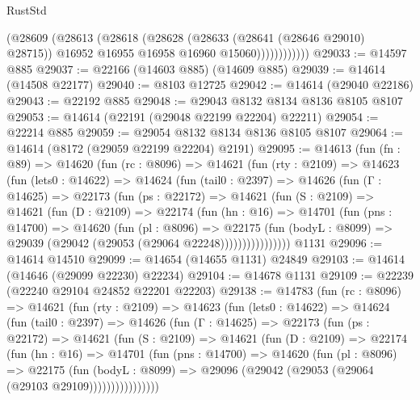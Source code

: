\begin{lexlean}{RustStd}
\begin{coremodule}
                    (@28609
                      (@28613
                        (@28618
                          (@28628
                            (@28633 (@28641 (@28646 @29010) @28715))
                            @16952
                            @16955
                            @16958
                            @16960
                            @15060))))))))))))
@29033 := @14597 @885
@29037 := @22166 (@14603 @885) (@14609 @885)
@29039 := @14614 (@14508 @22177)
@29040 := @8103 @12725
@29042 := @14614 (@29040 @22186)
@29043 := @22192 @885
@29048 := @29043 @8132 @8134 @8136 @8105 @8107
@29053 := @14614 (@22191 (@29048 @22199 @22204) @22211)
@29054 := @22214 @885
@29059 := @29054 @8132 @8134 @8136 @8105 @8107
@29064 := @14614 (@8172 (@29059 @22199 @22204) @2191)
@29095 := @14613
    (fun (fn : @89) =>
    @14620
      (fun (rc : @8096) =>
      @14621
        (fun (rty : @2109) =>
        @14623
          (fun (lets0 : @14622) =>
          @14624
            (fun (tail0 : @2397) =>
            @14626
              (fun (Γ : @14625) =>
              @22173
                (fun (ps : @22172) =>
                @14621
                  (fun (S : @2109) =>
                  @14621
                    (fun (D : @2109) =>
                    @22174
                      (fun (hn : @16) =>
                      @14701
                        (fun (pns : @14700) =>
                        @14620
                          (fun (pl : @8096) =>
                          @22175
                            (fun (bodyL : @8099) =>
                            @29039 (@29042 (@29053 (@29064 @22248))))))))))))))))
    @1131
@29096 := @14614 @14510
@29099 := @14654 (@14655 @1131) @24849
@29103 := @14614 (@14646 (@29099 @22230) @22234)
@29104 := @14678 @1131
@29109 := @22239 (@22240 @29104 @24852 @22201 @22203)
@29138 := @14783
    (fun (rc : @8096) =>
    @14621
      (fun (rty : @2109) =>
      @14623
        (fun (lets0 : @14622) =>
        @14624
          (fun (tail0 : @2397) =>
          @14626
            (fun (Γ : @14625) =>
            @22173
              (fun (ps : @22172) =>
              @14621
                (fun (S : @2109) =>
                @14621
                  (fun (D : @2109) =>
                  @22174
                    (fun (hn : @16) =>
                    @14701
                      (fun (pns : @14700) =>
                      @14620
                        (fun (pl : @8096) =>
                        @22175
                          (fun (bodyL : @8099) =>
                          @29096 (@29042 (@29053 (@29064 (@29103 @29109))))))))))))))))

\end{coremodule}
\end{lexlean}
